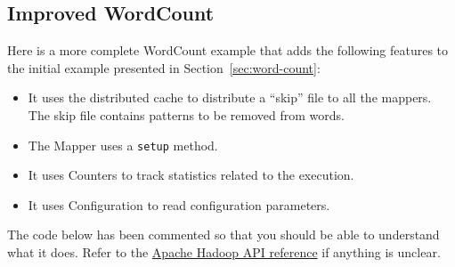 \documentclass[11pt]{article}
\begin{document}
\subsection{Improved WordCount}

Here is a more complete WordCount example that adds the following
features to the initial example presented in Section~\ref{sec:word-count}:
\begin{itemize}
\item It uses the distributed cache to distribute a ``skip'' file to all the mappers. The skip file contains patterns to be removed from words.
\item The Mapper uses a \texttt{setup} method.
\item It uses Counters to track statistics related to the execution.
\item It uses Configuration to read configuration parameters.  
\end{itemize}
The code below has been commented so that you should be able to
understand what it does. Refer to the
\href{http://hadoop.apache.org/docs/r2.7.3/api/index.html}{Apache
  Hadoop API reference} if anything is unclear.
\end{document}

